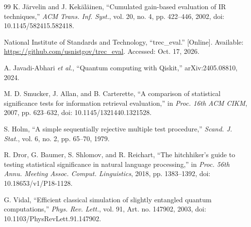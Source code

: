 \documentclass[conference]{IEEEtran}
\begin{document}
\begin{thebibliography}{99}
K. J\"arvelin and J. Kek\"al\"ainen, ``Cumulated gain-based evaluation of IR techniques,'' \textit{ACM Trans. Inf. Syst.}, vol. 20, no. 4, pp. 422--446, 2002, doi: 10.1145/582415.582418.

National Institute of Standards and Technology, ``trec\_eval.'' [Online]. Available: \url{https://github.com/usnistgov/trec_eval}. Accessed: Oct. 17, 2026.

A. Javadi-Abhari \textit{et al.}, ``Quantum computing with Qiskit,'' arXiv:2405.08810, 2024.

M. D. Smucker, J. Allan, and B. Carterette, ``A comparison of statistical significance tests for information retrieval evaluation,'' in \textit{Proc. 16th ACM CIKM}, 2007, pp. 623--632, doi: 10.1145/1321440.1321528.

S. Holm, ``A simple sequentially rejective multiple test procedure,'' \textit{Scand. J. Stat.}, vol. 6, no. 2, pp. 65--70, 1979.

R. Dror, G. Baumer, S. Shlomov, and R. Reichart, ``The hitchhiker's guide to testing statistical significance in natural language processing,'' in \textit{Proc. 56th Annu. Meeting Assoc. Comput. Linguistics}, 2018, pp. 1383--1392, doi: 10.18653/v1/P18-1128.

G. Vidal, ``Efficient classical simulation of slightly entangled quantum computations,'' \textit{Phys. Rev. Lett.}, vol. 91, Art. no. 147902, 2003, doi: 10.1103/PhysRevLett.91.147902.

\end{thebibliography}
\end{document}
